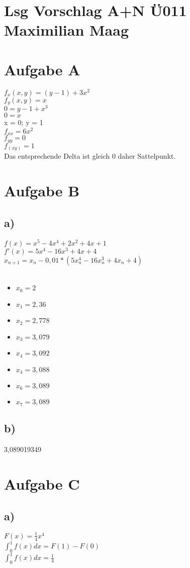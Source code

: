 \documentclass{article}
\begin{document}
	\section*{Lsg Vorschlag A+N Ü011 Maximilian Maag}
	\section*{Aufgabe A}
	$f_x(x,y) = (y-1) + 3x^2$ \\
	$f_y(x,y) = x$ \\
	$0 = y-1 + x^3$ \\
	$0 = x$ \\
	x = 0; y = 1 \\
	$f_{xx} = 6x^2$ \\
	$f_{yy} = 0$ \\
	$f_(xy) = 1$ \\
	Das entsprechende Delta ist gleich 0 daher Sattelpunkt. 
	\section*{Aufgabe B}
	\subsection*{a)}
	$f(x) = x^5 - 4x^4 + 2x^2 + 4x + 1$ \\
	$f'(x) = 5x^4 - 16x^3 + 4x + 4$ \\
	$x_{n+1} = x_n - 0,01 * (5x_n^4 - 16x_n^3 + 4x_n + 4)$ \\ \\
	\begin{itemize}
		\item $x_0 = 2$
		\item $x_1 = 2,36$
		\item $x_2 = 2,778$
		\item $x_3 = 3,079$
		\item $x_4 = 3,092$
		\item $x_4 = 3,088$
		\item $x_6 = 3,089$
		\item $x_7 = 3,089$
	\end{itemize}
\subsection*{b)}
	3,089019349
	\section*{Aufgabe C}
	\subsection*{a)}
	$F(x) = \frac{1}{4}x^4$ \\
	$\int_{0}^{1}f(x)dx = F(1) - F(0)$ \\
	$\int_{0}^{1}f(x)dx = \frac{1}{4}$
\end{document}
